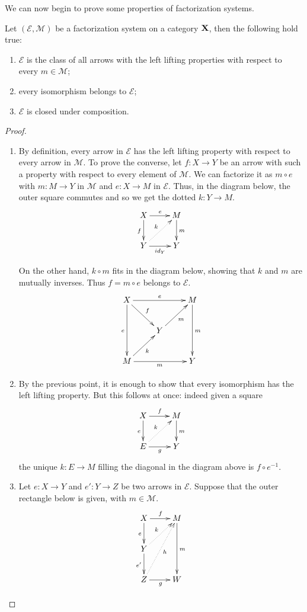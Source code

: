 \documentclass[a4paper,UKenglish,cleveref,pdftex,thm-restate,numberwithinsect]{lipics-v2021}
\newcommand{\id}[1]{\mathsf{id}_{#1}}
\def\X{\textbf {\textup{X}}}
\def\Y{\textbf {\textup{Y}}}
\def\Z{\textbf {\textup{Z}}}
\begin{document}
We can now begin to prove some properties of factorization systems.

\begin{proposition}\label{prop:el}
	Let $(\mathcal{E}, \mathcal{M})$ be a factorization system on a category $\X$, then the following hold true:
	\begin{enumerate}
		\item $\mathcal{E}$ is the class of all arrows with the left lifting properties with respect to every $m\in \mathcal{M}$;
		\item every isomorphism belongs to $\mathcal{E}$;
		\item $\mathcal{E}$ is closed under composition.
	\end{enumerate}
\end{proposition}
\begin{proof}
	\begin{enumerate}
		\item By definition, every arrow in $\mathcal{E}$ has the left lifting property with respect to every arrow in $\mathcal{M}$. To prove the converse, let $f\colon X\to Y$ be an arrow with such a property with respect to every element of $\mathcal{M}$.  We can factorize it as $m\circ e$ with $m\colon M\to Y$ in $\mathcal{M}$ and $e\colon X\to M$ in $\mathcal{E}$. Thus, in the diagram below, the outer square commutes and so we get the dotted $k\colon Y\to M$.
		\[\xymatrix{X\ar[d]_f\ar[r]^e & M\ar[d]^{m}\\Y\ar[r]_{\id{Y}} \ar@{.>}[ur]^{k} & Y}\]
		
		On the other hand, $k\circ m$ fits in the diagram below, showing that $k$ and $m$ are mutually inverses. Thus $f=m\circ e$ belongs to $\mathcal{E}$.
		\[\xymatrix{X\ar[rr]^{e} \ar[dd]_{e} \ar[dr]^{f}&& M\ar[dd]^{m} \ar@{<-}[dl]^{m}\\& Y\ar@{<-}[dl]^{k}\\M \ar[rr]_{m}&&Y}\]
		\item By the previous point, it is enough to show that every isomorphism has the left lifting property. But this follows at once: indeed given a square
		\[\xymatrix{X\ar[d]_e\ar[r]^f & M\ar[d]^{m}\\E\ar[r]_{g} \ar@{.>}[ur]^{k} & Y}\]
		the unique $k\colon E\to M$ filling the diagonal in the diagram above is $f\circ e^{-1}$.
		
		\item Let $e\colon X\to Y$ and $e'\colon Y\to Z$ be two arrows in $\mathcal{E}$. Suppose that the outer rectangle below is given, with $m\in \mathcal{M}$.
		\[\xymatrix{X  \ar[r]^f \ar[d]_{e}& M \ar[dd]^{m}\\Y \ar@{.>}[ur]^{k} \ar[d]_{e'}\\Z \ar@{.>}[uur]_{h}\ar[r]_{g}& W}\]
		

\end{enumerate}
\end{proof}
\end{document}

